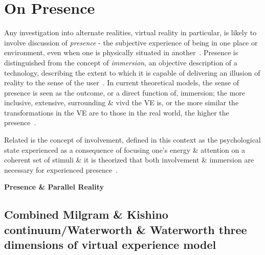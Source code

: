 
\pagebreak

\section{On Presence}

Any investigation into alternate realities, virtual reality in particular, is likely to involve discussion of \textit{presence} - the subjective experience of being in one place or environment, even when one is physically situated in another~\cite{Witmer1998}. Presence is distinguished from the concept of \textit{immersion}, an objective description of a technology, describing the extent to which it is capable of delivering an illusion of reality to the sense of the user~\cite{Slater1997}. In current theoretical models, the sense of presence is seen as the outcome, or a direct function of, immersion; the more inclusive, extensive, surrounding \& vivd the VE is, or the more similar the transformations in the VE are to those in the real world, the higher the presence~\cite{Constantin2003}.

Related is the concept of involvement, defined in this context as the psychological state experienced as a consequence of focusing one's energy \& attention on a coherent set of stimuli \& it is theorized that both involvement \& immersion are necessary for experienced presence~\cite{Witmer1998}.

\textbf{Presence \& Parallel Reality}

\subsection{Combined Milgram \& Kishino continuum/Waterworth \& Waterworth three dimensions of virtual experience model}

\newcommand{\presencefootnote}{\footnote{\textbf{Presence} in this context is defined as a state of heightened perceptual processing of environmental stimuli (\textit{``a psychological focus on direct perceptual processing''}~\cite{Waterworth2001}) accompanied by lessened conceptual reasoning, whether these environmental stimuli originate from a real environment, a virtual environment, a mixed reality environment, or even from multiple discrete environments.}}

